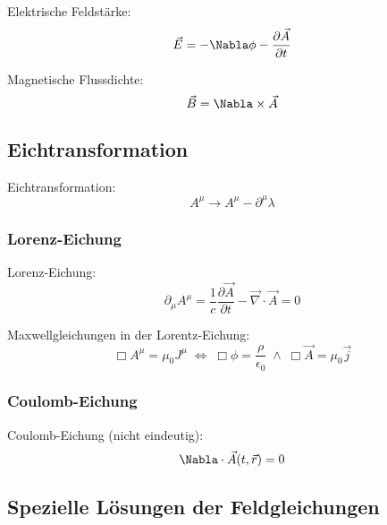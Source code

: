 \documentclass[11pt]{article}
\numberwithin{equation}{section}
\begin{document}
      Elektrische Feldstärke:
      \begin{equation}
        \vec{E} = -\Nabla\phi-\pder{\vec{A}}{t}
      \end{equation}

      Magnetische Flussdichte:
      \begin{equation}
        \vec{B} = \Nabla\times\vec{A}
      \end{equation}

    \subsection{Eichtransformation}
      Eichtransformation:
      \begin{equation}
        A^\mu \rightarrow A^\mu-\partial^\mu \lambda
      \end{equation}

      \subsubsection{Lorenz-Eichung}
        Lorenz-Eichung:
        \begin{equation}
          \partial_\mu A^\mu = \frac{1}{c}\frac{\partial \vec{A}}{\partial t} - \vec{\nabla}\cdot\vec{A} = 0
        \end{equation}

        Maxwellgleichungen in der Lorentz-Eichung:
        \begin{equation}
          \Box A^\mu = \mu_0 J^\mu \;\Leftrightarrow\;
          \Box \phi = \dfrac{\rho}{\epsilon_0} \;\wedge\;
          \Box \vec{A} = \mu_0 \vec{j}
        \end{equation}

      \subsubsection{Coulomb-Eichung}
        Coulomb-Eichung (nicht eindeutig):
        \begin{equation}
          \Nabla\cdot\vec{A}(t,\vec{r})=0
        \end{equation}

    \subsection{Spezielle Lösungen der Feldgleichungen}
\end{document}

